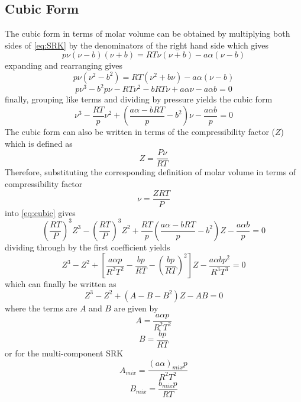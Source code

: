 \documentclass{article}
\begin{document}
\subsection{Cubic Form}
The cubic form in terms of molar volume can be obtained by multiplying both sides of \eqref{eq:SRK} by the denominators of the right hand side which gives
\begin{equation*}
    p\nu(\nu-b)(\nu+b) = RT\nu(\nu+b) - a\alpha(\nu-b)
\end{equation*}
expanding and rearranging gives
\begin{equation*}
    p\nu(\nu^2-b^2) = RT(\nu^2+b\nu)-a\alpha(\nu-b)
\end{equation*}
\begin{equation*}
    p\nu^3-b^2p\nu-RT\nu^2-bRT\nu+a\alpha\nu-a\alpha b=0
\end{equation*}
finally, grouping like terms and dividing by pressure yields the cubic form
\begin{equation}
    \nu^3-\frac{RT}{p}\nu^2+\left(\frac{a\alpha - bRT}{p}-b^2\right)\nu - \frac{a\alpha b}{p}=0\label{eq:cubic}
\end{equation}
The cubic form can also be written in terms of the compressibility factor ($Z$) which is defined as
\begin{equation}
    Z = \frac{P\nu}{RT}
\end{equation}
Therefore, substituting the corresponding definition of molar volume in terms of compressibility factor
\begin{equation}
    \nu = \frac{ZRT}{P}\label{nuZ}
\end{equation} 
into \eqref{eq:cubic} gives
\begin{equation*}
    \left(\frac{RT}{P}\right)^3Z^3 - \left(\frac{RT}{P}\right)^3Z^2 + \frac{RT}{p}\left(\frac{a\alpha - bRT}{p}-b^2\right) Z - \frac{a\alpha b}{p} = 0
\end{equation*}
dividing through by the first coefficient yields
\begin{equation*}
    Z^3 - Z^2 + \left[\frac{a\alpha p}{R^2T^2} - \frac{bp}{RT} - \left(\frac{bp}{RT}\right)^2\right] Z - \frac{a\alpha bp^2}{R^3T^3} = 0
\end{equation*}
which can finally be written as
\begin{equation}
    Z^3 - Z^2 + (A - B - B^2)Z - AB = 0\label{Zcubic}
\end{equation}
where the terms are $A$ and $B$ are given by
\begin{equation}
    A = \frac{a\alpha p}{R^2 T^2}
\end{equation}
\begin{equation}
    B = \frac{bp}{RT}
\end{equation}
or for the multi-component SRK
\begin{equation}
    A_{mix} = \frac{(a\alpha)_{mix} p}{R^2 T^2} \label{eq:A}
\end{equation}
\begin{equation}
    B_{mix} = \frac{b_{mix} p}{RT} \label{eq:B}
\end{equation}
\end{document}
